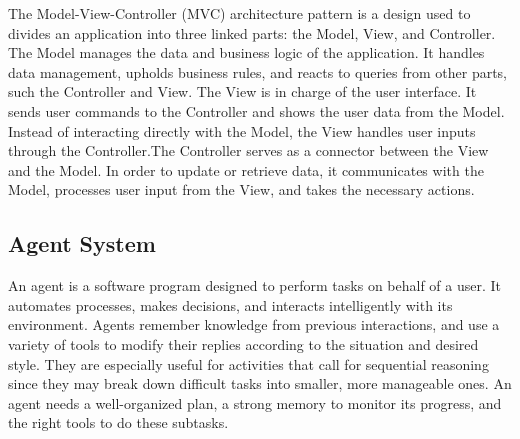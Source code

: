     The Model-View-Controller (MVC) architecture pattern is a design used to divides an application into three linked parts: the Model, View, and Controller. The Model manages the data and business logic of the application. It handles data management, upholds business rules, and reacts to queries from other parts, such the Controller and View. The View is in charge of the user interface. It sends user commands to the Controller and shows the user data from the Model. Instead of interacting directly with the Model, the View handles user inputs through the Controller.The Controller serves as a connector between the View and the Model. In order to update or retrieve data, it communicates with the Model, processes user input from the View, and takes the necessary actions. 
    \cite{GeeksforGeeks}

    \subsection{Agent System}
    An agent is a software program designed to perform tasks on behalf of a user. It automates processes, makes decisions, and interacts intelligently with its environment. Agents remember knowledge from previous interactions, and use a variety of tools to modify their replies according to the situation and desired style. They are especially useful for activities that call for sequential reasoning since they may break down difficult tasks into smaller, more manageable ones. An agent needs a well-organized plan, a strong memory to monitor its progress, and the right tools to do these subtasks. 

